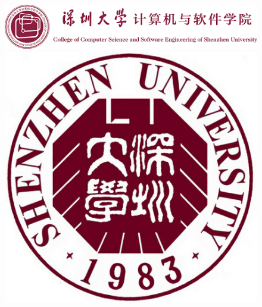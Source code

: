 \documentclass[UTF8]{ctexart}
\author{Wu Ting}
\begin{document}
\begin{figure}[H]
    \vspace*{-40pt}
    \flushleft\includegraphics[scale = 0.9]{szucsselogo}
    \vspace*{-70pt}
    \flushright\includegraphics[scale = 0.15]{b57}
\end{figure}
\end{document}
